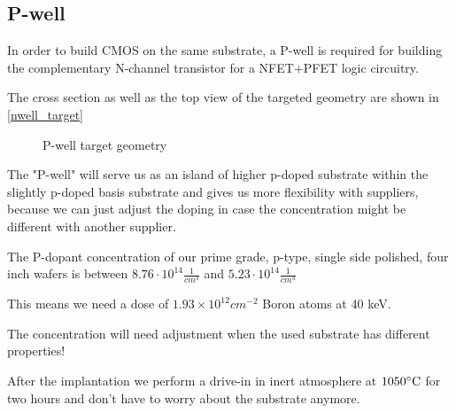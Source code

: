 \subsection{P-well}\label{pwell_chapter}

In order to build CMOS on the same substrate, a P-well is required for building the complementary N-channel transistor for a NFET+PFET logic circuitry.

The cross section as well as the top view of the targeted geometry are shown in \autoref{nwell_target}

\begin{figure}[H]
	\centering
	\begin{tikzpicture}[node distance = 3cm, auto, thick,scale=\CrossAndTopSectionBig, every node/.style={transform shape}]
		
	\end{tikzpicture}
	\begin{tikzpicture}[node distance = 3cm, auto, thick,scale=\CrossAndTopSectionBig, every node/.style={transform shape}]
		
	\end{tikzpicture}
	\caption{P-well target geometry}
	\label{pwell_target}
\end{figure}

The "P-well" will serve us as an island of higher p-doped substrate within the slightly p-doped basis substrate and gives us more flexibility with suppliers, because we can just adjust the doping in case the concentration might be different with another supplier.

The P-dopant concentration of our prime grade, p-type, single side polished, four inch wafers is between $8.76 \cdot 10^{14} \frac{1}{cm^3}$ and $5.23 \cdot 10^{14} \frac{1}{cm^3}$

This means we need a dose of $1.93\times10^{12}cm^{-2}$ Boron atoms at 40 keV.

The concentration will need adjustment when the used substrate has different properties!

After the implantation we perform a drive-in in inert atmosphere at $1050\degreesC$ for two hours and don't have to worry about the substrate anymore.

